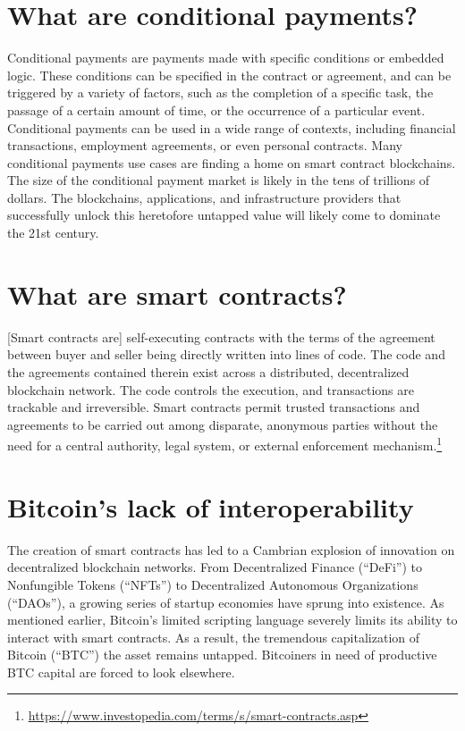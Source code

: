 \documentclass[twoside, a4paper, 11pt]{article}
\begin{document}
  \section{What are conditional payments?}

  Conditional payments are payments made with specific conditions or embedded logic. These conditions can be specified in the contract or agreement, and can be triggered by a variety of factors, such as the completion of a specific task, the passage of a certain amount of time, or the occurrence of a particular event. Conditional payments can be used in a wide range of contexts, including financial transactions, employment agreements, or even personal contracts. Many conditional payments use cases are finding a home on smart contract blockchains. The size of the conditional payment market is likely in the tens of trillions of dollars. The blockchains, applications, and infrastructure providers that successfully unlock this heretofore untapped value will likely come to dominate the 21st century.

  \section{What are smart contracts?}

  [Smart contracts are] self-executing contracts with the terms of the agreement between buyer and seller being directly written into lines of code. The code and the agreements contained therein exist across a distributed, decentralized blockchain network. The code controls the execution, and transactions are trackable and irreversible. Smart contracts permit trusted transactions and agreements to be carried out among disparate, anonymous parties without the need for a central authority, legal system, or external enforcement mechanism.\footnote{\url{ https://www.investopedia.com/terms/s/smart-contracts.asp}}

  \section{Bitcoin’s lack of interoperability}

  The creation of smart contracts has led to a Cambrian explosion of innovation on decentralized blockchain networks. From Decentralized Finance (“DeFi”) to Nonfungible Tokens (“NFTs”) to Decentralized Autonomous Organizations (“DAOs”), a growing series of startup economies have sprung into existence. As mentioned earlier, Bitcoin’s limited scripting language severely limits its ability to interact with smart contracts. As a result, the tremendous capitalization of Bitcoin (“BTC”) the asset remains untapped. Bitcoiners in need of productive BTC capital are forced to look elsewhere.
\end{document}
